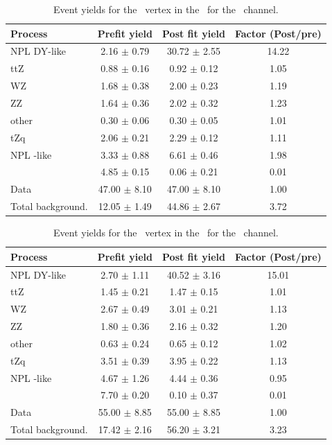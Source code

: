 \begin{table}[htbp]
	\centering
	\caption{Event yields for the \Zct\ vertex in the \STSR\  for the \emumu\ channel. }
	\begin{tabular} {l c c c }
		\toprule
		Process & Prefit yield & Post fit yield & Factor (Post/pre) \\
		\midrule
		NPL DY-like & 2.16 $ \pm $ 0.79 & 30.72 $ \pm $ 2.55 & 14.22 \\ 
		ttZ & 0.88 $ \pm $ 0.16 & 0.92 $ \pm $ 0.12 & 1.05 \\ 
		WZ & 1.68 $ \pm $ 0.38 & 2.00 $ \pm $ 0.23 & 1.19 \\ 
		ZZ & 1.64 $ \pm $ 0.36 & 2.02 $ \pm $ 0.32 & 1.23 \\ 
		other & 0.30 $ \pm $ 0.06 & 0.30 $ \pm $ 0.05 & 1.01 \\ 
		tZq & 2.06 $ \pm $ 0.21 & 2.29 $ \pm $ 0.12 & 1.11 \\ 
		NPL \ttbar-like & 3.33 $ \pm $ 0.88 & 6.61 $ \pm $ 0.46 & 1.98\\
		\kZct  & 4.85 $ \pm $ 0.15 & 0.06 $ \pm $ 0.21 & 0.01\\
		\hdashline
		Data & 47.00 $ \pm $ 8.10 & 47.00 $ \pm $ 8.10 & 1.00\\
		Total background. & 12.05 $ \pm $ 1.49 & 44.86 $ \pm $ 2.67 & 3.72\\
		\bottomrule
	\end{tabular}
\end{table}
\begin{table}[htbp]
	\centering
	\caption{Event yields for the \Zct\ vertex in the \STSR\  for the \mumumu\ channel. }
	\begin{tabular} {l c c c }
		\toprule
		Process & Prefit yield & Post fit yield & Factor (Post/pre) \\
		\midrule
		NPL DY-like & 2.70 $ \pm $ 1.11 & 40.52 $ \pm $ 3.16 & 15.01 \\ 
		ttZ & 1.45 $ \pm $ 0.21 & 1.47 $ \pm $ 0.15 & 1.01 \\ 
		WZ & 2.67 $ \pm $ 0.49 & 3.01 $ \pm $ 0.21 & 1.13 \\ 
		ZZ & 1.80 $ \pm $ 0.36 & 2.16 $ \pm $ 0.32 & 1.20 \\ 
		other & 0.63 $ \pm $ 0.24 & 0.65 $ \pm $ 0.12 & 1.02 \\ 
		tZq & 3.51 $ \pm $ 0.39 & 3.95 $ \pm $ 0.22 & 1.13 \\ 
		NPL \ttbar-like & 4.67 $ \pm $ 1.26 & 4.44 $ \pm $ 0.36 & 0.95\\
		\kZct  & 7.70 $ \pm $ 0.20 & 0.10 $ \pm $ 0.37 & 0.01\\
		\hdashline
		Data & 55.00 $ \pm $ 8.85 & 55.00 $ \pm $ 8.85 & 1.00\\
		Total background. & 17.42 $ \pm $ 2.16 & 56.20 $ \pm $ 3.21 & 3.23\\
		\bottomrule
	\end{tabular}
\end{table}
